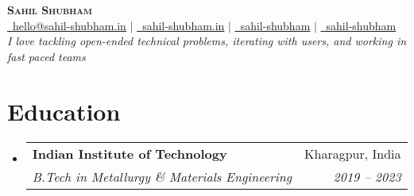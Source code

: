 \documentclass[letterpaper,11pt]{article}
\makeatletter
\newcommand{\resumeSubheading}[4]{
  \vspace{1pt}\item %
    \begin{tabular*}{0.97\textwidth}[t]{l@{\extracolsep{\fill}}r}
      \textbf{#1} & \small #2 \\ %
      \textit{\small#3} & \textit{\small #4} \\
    \end{tabular*}\vspace{-6pt} %
}
\newcommand{\resumeSubHeadingListStart}{\begin{itemize}[leftmargin=0.0in, label={}]} %
\newcommand{\resumeSubHeadingListEnd}{\end{itemize}} %
\makeatother
\begin{document}
\begin{center}
  \textbf{\Huge \scshape Sahil Shubham} \\ \vspace{2.5pt}
  \small \href{mailto:hello@sahil-shubham.in}{\faEnvelope \, hello@sahil-shubham.in} $|$ 
    \href{https://sahil-shubham.in}{\faGlobe \, sahil-shubham.in} $|$
    \href{https://github.com/sahil-shubham}{\faGithub \, sahil-shubham} 
    $|$ \href{https://www.linkedin.com/in/sahil-shubham/}{\faLinkedin \, sahil-shubham} 
    \\ \vspace{3pt} %
    \emph{I love tackling open-ended technical problems, iterating with users, and working in fast paced teams} \vspace{-5pt}
\end{center}

\section{Education}
\resumeSubHeadingListStart
\resumeSubheading
{Indian Institute of Technology}{Kharagpur, India}
{B.Tech in Metallurgy \& Materials Engineering} {2019 -- 2023} %
\resumeSubHeadingListEnd




\end{document}
